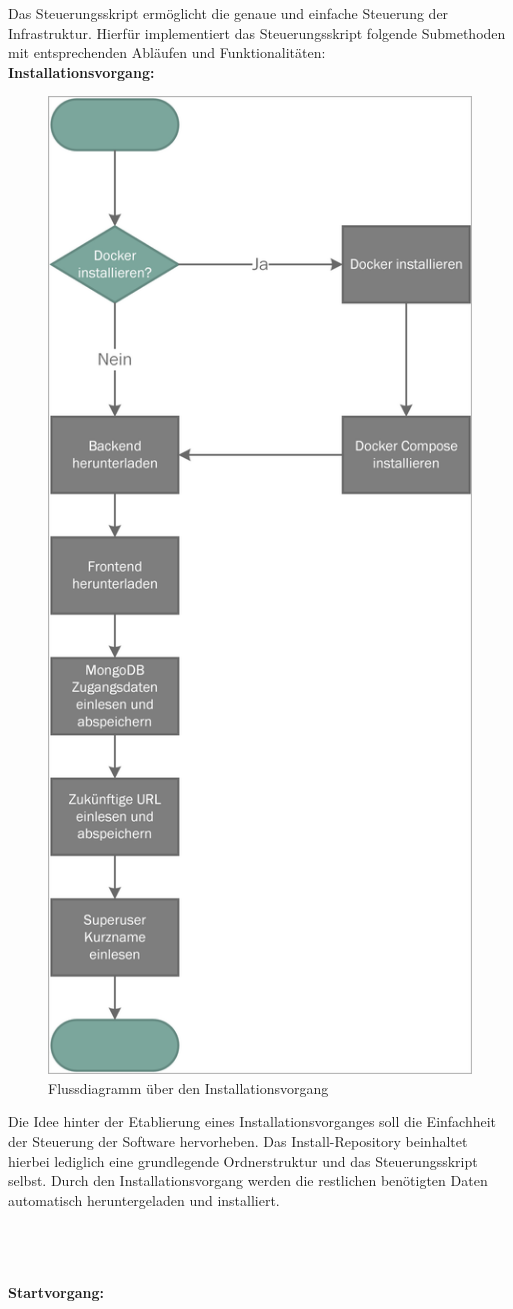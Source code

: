 Das Steuerungsskript ermöglicht die genaue und einfache Steuerung der Infrastruktur.
Hierfür implementiert das Steuerungsskript folgende Submethoden mit entsprechenden Abläufen und Funktionalitäten:\\

\textbf{Installationsvorgang:}

\begin{figure}[H]
	\centering
	\includegraphics[width=0.5\linewidth]{images/mbeier_konzept/Install_border}
	\caption[Flussdiagramm über den Installationsvorgang]{Flussdiagramm über den Installationsvorgang}
	\label{fig:install}
\end{figure}

\newpage

Die Idee hinter der Etablierung eines Installationsvorganges soll die Einfachheit der Steuerung der Software hervorheben. Das Install-Repository beinhaltet hierbei lediglich eine grundlegende Ordnerstruktur und das Steuerungsskript selbst. Durch den Installationsvorgang werden die restlichen benötigten Daten automatisch heruntergeladen und installiert.

~\\~\\~\\
\textbf{Startvorgang:}

